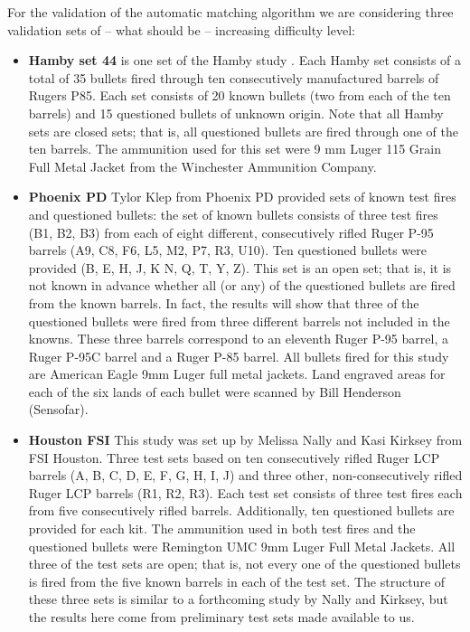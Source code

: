 \documentclass[doubleblind]{elsarticle}\usepackage[]{graphicx}\usepackage[]{color}
\begin{document}
For the validation of the automatic matching algorithm we are considering three validation sets of -- what should be -- increasing difficulty level: 
\begin{itemize}
\item {\bf Hamby set 44} is one set of the Hamby study \citep{hamby}. Each Hamby set  consists of a total of 35 bullets fired through ten consecutively manufactured barrels of Rugers P85. Each set consists of 20 known bullets (two from each of the ten barrels) and 15 questioned bullets of unknown origin. Note that all Hamby sets are closed sets; that is, all questioned bullets are fired through one of the ten barrels. The ammunition used for this set were 9 mm Luger 115 Grain Full Metal Jacket  from the Winchester Ammunition Company.
\item {\bf Phoenix PD}
Tylor Klep from Phoenix PD provided sets of known test fires and questioned bullets: the set of known bullets consists of three test fires (B1, B2, B3) from each of eight different, consecutively rifled Ruger P-95 barrels (A9, C8, F6, L5, M2, P7, R3, U10). Ten questioned bullets were provided (B, E, H, J, K N, Q, T, Y, Z). This set is an open set; that is, it is not known in advance whether all (or any) of the questioned bullets are fired from the known barrels. In fact, the results will show that three of the questioned bullets were fired from three different barrels not included in the knowns. These three barrels correspond to an eleventh Ruger P-95 barrel, a Ruger P-95C barrel and a Ruger P-85 barrel. All bullets fired for this study are American Eagle 9mm  Luger full metal jackets.
Land engraved areas for each of the six lands of each bullet were scanned by Bill Henderson (Sensofar).
\item {\bf Houston FSI}
This study was set up by Melissa Nally and Kasi Kirksey from FSI Houston. Three test sets based on ten consecutively rifled Ruger LCP barrels (A, B, C, D, E, F, G, H, I, J) and three other, non-consecutively rifled Ruger LCP barrels (R1, R2, R3). Each test set consists of three test fires each from five consecutively rifled barrels. Additionally, ten questioned bullets are provided for each kit. The ammunition used in both test fires and the questioned bullets were Remington UMC 9mm Luger Full Metal Jackets. All three of the test sets are open; that is, not every one of the questioned bullets is fired from the five known barrels in each of the test set.
The structure of these three sets is similar to a forthcoming study by Nally and Kirksey, but the results here come from preliminary test sets made available to us.
\end{itemize}
\end{document}
